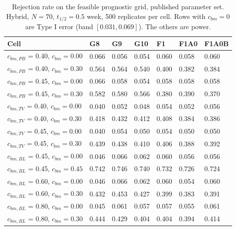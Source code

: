 \documentclass[
  11pt,
]{article}
\begin{document}
\begin{table}
\centering
\caption{\label{tab:tab-grid}Rejection rate on the feasible prognostic grid,
      published parameter set. Hybrid, $N = 70$, $t_{1/2} = 0.5$
      week, 500 replicates per cell. Rows with $c_{bm} = 0$ are Type I
      error (band $[0.031, 0.069]$). The others are power.}
\centering
\fontsize{9}{11}\selectfont
\begin{tabular}[t]{lllllll}
\toprule
Cell & G8 & G9 & G10 & F1 & F1A0 & F1A0B\\
\midrule
$c_{bm,PB}$ = 0.40, $c_{bm} = 0.00$ & 0.066 & 0.056 & 0.054 & 0.060 & 0.058 & 0.060\\
$c_{bm,PB}$ = 0.40, $c_{bm} = 0.30$ & 0.564 & 0.564 & 0.540 & 0.400 & 0.382 & 0.384\\
$c_{bm,PB}$ = 0.45, $c_{bm} = 0.00$ & 0.066 & 0.058 & 0.054 & 0.058 & 0.058 & 0.058\\
$c_{bm,PB}$ = 0.45, $c_{bm} = 0.30$ & 0.582 & 0.580 & 0.566 & 0.380 & 0.390 & 0.370\\
$c_{bm,TV}$ = 0.40, $c_{bm} = 0.00$ & 0.040 & 0.052 & 0.048 & 0.054 & 0.052 & 0.056\\
$c_{bm,TV}$ = 0.40, $c_{bm} = 0.30$ & 0.418 & 0.432 & 0.412 & 0.408 & 0.384 & 0.386\\
$c_{bm,TV}$ = 0.45, $c_{bm} = 0.00$ & 0.040 & 0.054 & 0.050 & 0.054 & 0.050 & 0.050\\
$c_{bm,TV}$ = 0.45, $c_{bm} = 0.30$ & 0.439 & 0.438 & 0.410 & 0.406 & 0.388 & 0.392\\
$c_{bm,BL}$ = 0.45, $c_{bm} = 0.00$ & 0.046 & 0.066 & 0.062 & 0.060 & 0.056 & 0.056\\
$c_{bm,BL}$ = 0.45, $c_{bm} = 0.45$ & 0.742 & 0.746 & 0.740 & 0.732 & 0.726 & 0.724\\
$c_{bm,BL}$ = 0.60, $c_{bm} = 0.00$ & 0.046 & 0.066 & 0.062 & 0.060 & 0.054 & 0.060\\
$c_{bm,BL}$ = 0.60, $c_{bm} = 0.30$ & 0.432 & 0.453 & 0.427 & 0.399 & 0.383 & 0.391\\
$c_{bm,BL}$ = 0.80, $c_{bm} = 0.00$ & 0.045 & 0.061 & 0.057 & 0.057 & 0.055 & 0.061\\
$c_{bm,BL}$ = 0.80, $c_{bm} = 0.30$ & 0.444 & 0.429 & 0.404 & 0.404 & 0.394 & 0.414\\
\bottomrule
\end{tabular}
\end{table}
\end{document}
